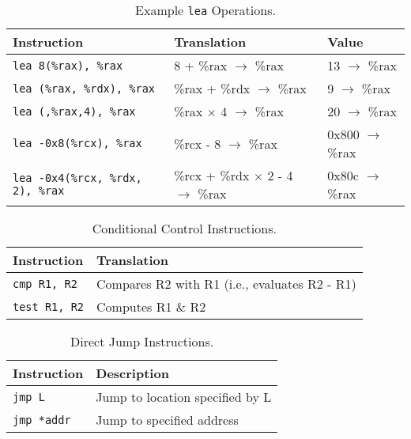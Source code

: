 \documentclass{article}
\begin{document}
\begin{table}[p]
\centering
\begin{tabularx}{\textwidth}{lll}
\hline
\textbf{Instruction} & \textbf{Translation} & \textbf{Value} \\
\hline
\texttt{lea 8(\%rax), \%rax}     & 8 + \%rax $\rightarrow$ \%rax    & 13 $\rightarrow$ \%rax \\
\texttt{lea (\%rax, \%rdx), \%rax} & \%rax + \%rdx $\rightarrow$ \%rax & 9 $\rightarrow$ \%rax \\
\texttt{lea (,\%rax,4), \%rax}    & \%rax $\times$ 4 $\rightarrow$ \%rax & 20 $\rightarrow$ \%rax \\
\texttt{lea -0x8(\%rcx), \%rax}   & \%rcx - 8 $\rightarrow$ \%rax    & 0x800 $\rightarrow$ \%rax \\
\texttt{lea -0x4(\%rcx, \%rdx, 2), \%rax} & \%rcx + \%rdx $\times$ 2 - 4 $\rightarrow$ \%rax & 0x80c $\rightarrow$ \%rax \\
\hline
\end{tabularx}
\caption{Example \texttt{lea} Operations.}
\label{table:example-lea-operations}
\end{table}


\begin{table}[p]
\centering
\begin{tabularx}{\textwidth}{XX}
\hline
\textbf{Instruction} & \textbf{Translation} \\
\hline
\texttt{cmp R1, R2} & Compares R2 with R1 (i.e., evaluates R2 - R1) \\
\texttt{test R1, R2} & Computes R1 \& R2 \\
\hline
\end{tabularx}
\caption{Conditional Control Instructions.}
\label{table:conditional-control-instructions}
\end{table}


\begin{table}[p]
\centering
\begin{tabularx}{\textwidth}{XX}
\hline
\textbf{Instruction} & \textbf{Description} \\
\hline
\texttt{jmp L}     & Jump to location specified by L \\
\texttt{jmp *addr} & Jump to specified address \\
\hline
\end{tabularx}
\caption{Direct Jump Instructions.}
\label{table:direct-jump-instructions}
\end{table}
\end{document}
